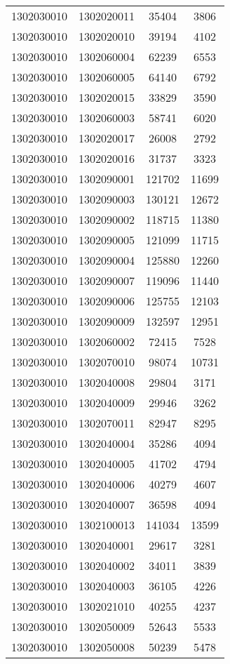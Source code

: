 \begin{longtable}[h]{llcc}
		1302030010 & 1302020011 & 35404 & 3806\\
		1302030010 & 1302020010 & 39194 & 4102\\
		1302030010 & 1302060004 & 62239 & 6553\\
		1302030010 & 1302060005 & 64140 & 6792\\
		1302030010 & 1302020015 & 33829 & 3590\\
		1302030010 & 1302060003 & 58741 & 6020\\
		1302030010 & 1302020017 & 26008 & 2792\\
		1302030010 & 1302020016 & 31737 & 3323\\
		1302030010 & 1302090001 & 121702 & 11699\\
		1302030010 & 1302090003 & 130121 & 12672\\
		1302030010 & 1302090002 & 118715 & 11380\\
		1302030010 & 1302090005 & 121099 & 11715\\
		1302030010 & 1302090004 & 125880 & 12260\\
		1302030010 & 1302090007 & 119096 & 11440\\
		1302030010 & 1302090006 & 125755 & 12103\\
		1302030010 & 1302090009 & 132597 & 12951\\
		1302030010 & 1302060002 & 72415 & 7528\\
		1302030010 & 1302070010 & 98074 & 10731\\
		1302030010 & 1302040008 & 29804 & 3171\\
		1302030010 & 1302040009 & 29946 & 3262\\
		1302030010 & 1302070011 & 82947 & 8295\\
		1302030010 & 1302040004 & 35286 & 4094\\
		1302030010 & 1302040005 & 41702 & 4794\\
		1302030010 & 1302040006 & 40279 & 4607\\
		1302030010 & 1302040007 & 36598 & 4094\\
		1302030010 & 1302100013 & 141034 & 13599\\
		1302030010 & 1302040001 & 29617 & 3281\\
		1302030010 & 1302040002 & 34011 & 3839\\
		1302030010 & 1302040003 & 36105 & 4226\\
		1302030010 & 1302021010 & 40255 & 4237\\
		1302030010 & 1302050009 & 52643 & 5533\\
		1302030010 & 1302050008 & 50239 & 5478\\

\end{longtable}
